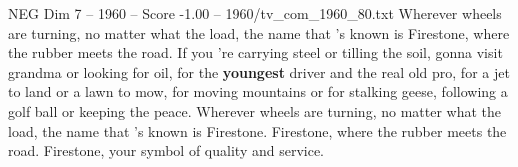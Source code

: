 \begin{textsample}{NEG Dim 7 – 1960 – Score -1.00 – 1960/tv\_com\_1960\_80.txt}  \label{ex:f7_neg_069}
Wherever wheels are turning, no matter what the load, the name that 's known is Firestone, where the rubber meets the road.
If you 're carrying steel or tilling the soil, gonna visit grandma or looking for oil, for the \textbf{youngest} driver and the real old pro, for a jet to land or a lawn to mow, for moving mountains or for stalking geese, following a golf ball or keeping the peace.
Wherever wheels are turning, no matter what the load, the name that 's known is Firestone.
Firestone, where the rubber meets the road.
Firestone, your symbol of quality and service.

\end{textsample}
